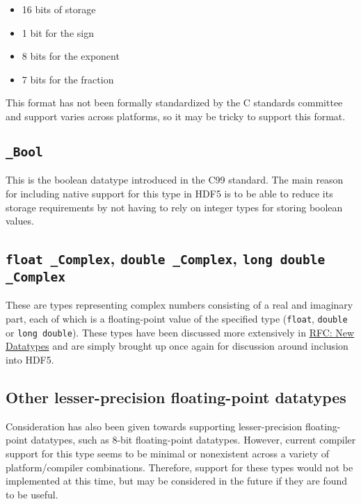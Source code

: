 \documentclass[../HDF5_RFC.tex]{subfiles}
\begin{document}
\begin{itemize}
    \item 16 bits of storage
    \item 1 bit for the sign
    \item 8 bits for the exponent
    \item 7 bits for the fraction
\end{itemize}

This format has not been formally standardized by the C standards committee and support varies across platforms, so it
may be tricky to support this format.

\subsection{\texttt{\_Bool}}

This is the boolean datatype introduced in the C99 standard. The main reason for including native support for this type
in HDF5 is to be able to reduce its storage requirements by not having to rely on integer types for storing boolean
values.

\subsection{\texttt{float \_Complex}, \texttt{double \_Complex}, \texttt{long double \_Complex}}

These are types representing complex numbers consisting of a real and imaginary part, each of which is a floating-point
value of the specified type (\texttt{float}, \texttt{double} or \texttt{long double}). These types have been discussed
more extensively in \href{https://github.com/HDFGroup/hdf5doc/blob/master/RFCs/HDF5_Library/New_Datatypes/new_datatypes.pdf}{RFC: New Datatypes}
and are simply brought up once again for discussion around inclusion into HDF5.

\subsection{Other lesser-precision floating-point datatypes}

Consideration has also been given towards supporting lesser-precision floating-point datatypes, such as 8-bit floating-point
datatypes. However, current compiler support for this type seems to be minimal or nonexistent across a variety of platform/compiler
combinations. Therefore, support for these types would not be implemented at this time, but may be considered in the future
if they are found to be useful.
\end{document}
